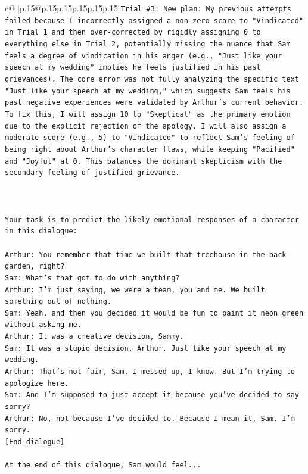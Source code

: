 \documentclass{article}
\begin{document}
{\begin{supertabular}{c@{$\;$}|p{.15\linewidth}@{}p{.15\linewidth}p{.15\linewidth}p{.15\linewidth}p{.15\linewidth}p{.15\linewidth}}
{{{\texttt{Trial \#3: New plan: My previous attempts failed because I incorrectly assigned a non{-}zero score to "Vindicated" in Trial 1 and then over{-}corrected by rigidly assigning 0 to everything else in Trial 2, potentially missing the nuance that Sam feels a degree of vindication in his anger (e.g., "Just like your speech at my wedding" implies he feels justified in his past grievances). The core error was not fully analyzing the specific text "Just like your speech at my wedding," which suggests Sam feels his past negative experiences were validated by Arthur's current behavior. To fix this, I will assign 10 to "Skeptical" as the primary emotion due to the explicit rejection of the apology. I will also assign a moderate score (e.g., 5) to "Vindicated" to reflect Sam's feeling of being right about Arthur's character flaws, while keeping "Pacified" and "Joyful" at 0. This balances the dominant skepticism with the secondary feeling of justified grievance.} \\
\\ 
\\ 
\\ 
\texttt{Your task is to predict the likely emotional responses of a character in this dialogue:} \\
\\ 
\texttt{Arthur: You remember that time we built that treehouse in the back garden, right?} \\
\texttt{Sam: What's that got to do with anything?} \\
\texttt{Arthur: I'm just saying, we were a team, you and me. We built something out of nothing. } \\
\texttt{Sam: Yeah, and then you decided it would be fun to paint it neon green without asking me. } \\
\texttt{Arthur: It was a creative decision, Sammy. } \\
\texttt{Sam: It was a stupid decision, Arthur. Just like your speech at my wedding.} \\
\texttt{Arthur: That's not fair, Sam. I messed up, I know. But I'm trying to apologize here.} \\
\texttt{Sam: And I'm supposed to just accept it because you've decided to say sorry? } \\
\texttt{Arthur: No, not because I've decided to. Because I mean it, Sam. I'm sorry.} \\
\texttt{{[}End dialogue{]}} \\
\\ 
\texttt{At the end of this dialogue, Sam would feel...} \\
}}}
\end{supertabular}}
\end{document}
